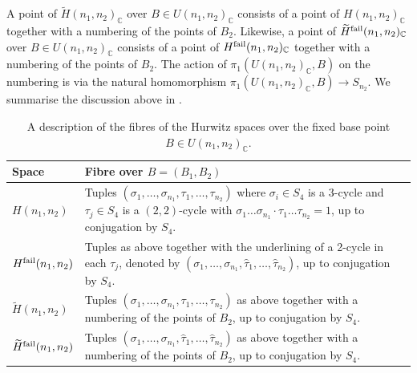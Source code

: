 \documentclass{amsart}
\numberwithin{equation}{section} \numberwithin{figure}{section}
\newcommand\CC{\mathbb{C}}
\theoremstyle{one}
\theoremstyle{definition}
\begin{document}
A point of \(\widetilde H(n_1,n_2)_{\CC}\) over \(B \in U(n_1,n_2)_{\CC}\) consists of a point of \(H(n_1,n_2)_{\CC}\) together with a numbering of the points of \(B_2\).
Likewise, a point of \(\widetilde H^{\rm fail}(n_1,n_2)_{\CC}\) over \(B \in U(n_1,n_2)_{\CC}\) consists of a point of \(H^{\rm fail}(n_1,n_2)_{\CC}\) together with a numbering of the points of \(B_2\).
The action of \(\pi_1(U(n_1,n_2)_{\CC}, B)\) on the numbering is via the natural homomorphism \(\pi_1(U(n_1,n_2)_{\CC},B) \to S_{n_2}\).
We summarise the discussion above in .

\begin{table}
  \centering
  \begin{tabular}{l p{}} \toprule
      Space & Fibre over $B=(B_1, B_2)$  
      \\ \midrule    
    \(H(n_1,n_2)\) & Tuples \((\sigma_1, \dots, \sigma_{n_1}, \tau_1, \dots, \tau_{n_2})\) where \(\sigma_i \in S_4\) is a 3-cycle and \(\tau_j \in S_4\) is a \((2,2)\)-cycle with \(\sigma_1 \dots \sigma_{n_1}\cdot \tau_1\dots  \tau_{n_2} = 1\), up to conjugation by \(S_4\).\\
    \(H^{\rm fail}(n_1,n_2)\) & Tuples as above together with the underlining of a 2-cycle in each \(\tau_j\), denoted by \((\sigma_1, \dots, \sigma_{n_1}, \hat{\tau}_1, \dots, \hat{\tau}_{n_2})\), up to conjugation by \(S_4\). \\
    \(\widetilde H(n_1,n_2)\) & Tuples \((\sigma_1, \dots, \sigma_{n_1}, \tau_1, \dots, \tau_{n_2})\) as above together with a numbering of the points of \(B_2\), up to conjugation by \(S_4\).\\
    \(\widetilde H^{\rm fail}(n_1,n_2)\) & Tuples \((\sigma_1, \dots, \sigma_{n_1}, \hat{\tau}_1, \dots, \hat{\tau}_{n_2})\) as above together with a numbering of the points of \(B_2\), up to conjugation by \(S_4\). \\
    \bottomrule
    \end{tabular}
    \caption{A description of the fibres of the Hurwitz spaces over the fixed base point \(B \in U(n_1,n_2)_{\CC}\).}
    \label{tab:points}
  \end{table}

 
  
\end{document}

